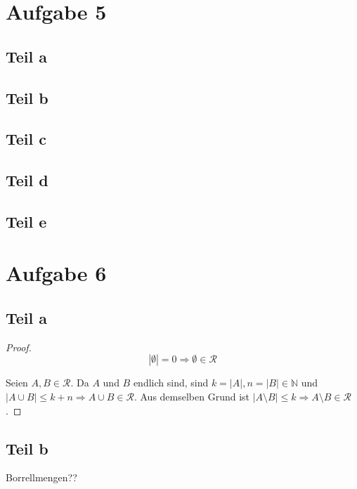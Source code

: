 \documentclass[10pt,a4paper]{article}
\begin{document}
\section{Aufgabe 5}

\subsection{Teil a}

\subsection{Teil b}

\subsection{Teil c}

\subsection{Teil d}

\subsection{Teil e}

\section{Aufgabe 6}

\subsection{Teil a}
\begin{proof}
  \begin{equation}
    |\emptyset| = 0 \Rightarrow \emptyset \in \mathscr{R}
  \end{equation}
  
  Seien $A, B \in \mathscr{R}$.
  Da $A$ und $B$ endlich sind, sind $k = |A|, n = |B| \in \mathbb{N}$ und $|A \cup B| \le k + n \Rightarrow A \cup B \in \mathscr{R}$.
  Aus demselben Grund ist $|A \setminus B| \le k \Rightarrow A \setminus B \in \mathscr{R}$.
\end{proof}

\subsection{Teil b}
Borrellmengen??
\end{document}

